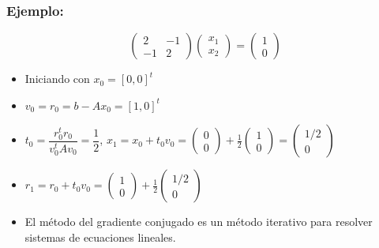 \documentclass[10pt]{beamer}
\begin{document}
\begin{frame}
  \frametitle{Ejemplo:}
  $$
  \left(\begin{array}{cc}
    2 & -1\\
    -1 & 2\end{array}\right)\left(\begin{array}{c}
    x_1\\
    x_2\end{array}\right) = \left(\begin{array}{c}
    1\\
    0\end{array}\right)
  $$
  \begin{itemize}
    \item<1->Iniciando con $x_0 = [0,0]^t$
    \item<2->$v_0 = r_0 = b-Ax_0 = [1,0]^t$
    \item<3->$t_0=\dfrac{r_0^tr_0}{v_0^tAv_0} = \dfrac{1}{2}$, $x_1=x_0+t_0v_0=\left(\begin{array}{c}
      0\\
      0\end{array}\right)+\frac{1}{2}\left(\begin{array}{c}
        1\\
        0\end{array}\right) = \left(\begin{array}{c}
          1/2\\
          0\end{array}\right)$
    \item<4->$r_1=r_0+t_0v_0=\left(\begin{array}{c}
      1\\
      0\end{array}\right)+\frac{1}{2}\left(\begin{array}{c}
        1/2\\
        0\end{array}\right)$
    \item<5->El m\'etodo del gradiente conjugado es un m\'etodo iterativo para resolver sistemas de ecuaciones lineales.
  \end{itemize}
\end{frame}
\end{document}

